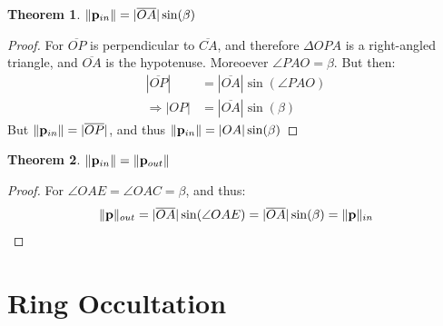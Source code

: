 \documentclass[oneside]{book}
\theoremstyle{mystyle}
\newtheorem{theorem}{Theorem}[section]
\DeclarePairedDelimiter\norm{\lVert}{\rVert}
\begin{document}
\begin{theorem}
$\norm{\mathbf{p}_{in}} = |\overline{OA}|\sin(\beta)$
\end{theorem}
\begin{proof}
For $\overline{OP}$ is perpendicular to $\overline{CA}$, and therefore $\Delta OPA$ is a right-angled triangle, and $\overline{OA}$ is the hypotenuse. Moreoever $\angle PAO = \beta$. But then:
\begin{align*}
|\overline{OP}| &= |\overline{OA}|\sin(\angle PAO)\\
\Rightarrow |OP| &= |\overline{OA}|\sin(\beta)
\end{align*}
But $\norm{\mathbf{p}_{in}} = |\overline{OP}|$, and thus $\norm{\mathbf{p}_{in}} = |OA|\sin(\beta)$
\end{proof}
\begin{theorem}
\label{theorem:p_out_equals_p_in}
$\norm{\mathbf{p}_{in}} = \norm{\mathbf{p}_{out}}$
\end{theorem}
\begin{proof}
For $\angle OAE = \angle OAC = \beta$, and thus:
\begin{equation*}
    \norm{\mathbf{p}}_{out} = |\overline{OA}|\sin(\angle OAE) = |\overline{OA}|\sin(\beta)=\norm{\mathbf{p}}_{in}
\end{equation*}
\end{proof}
\section{Ring Occultation}
\end{document}
